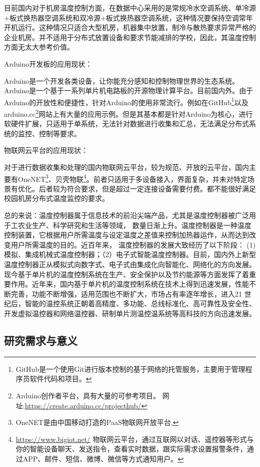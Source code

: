 目前国内对于机房温度控制方面，在数据中心采用的是常规冷水空调系统、单冷源+板式换热器空调系统和双冷源+板式换热器空调系统，这种情况要保持空调常年开机运行。这种情况只适合大型机房，机器集中放置，制冷与散热要求异常严格的企业机房。并不适用于分布式放置设备和要求节能减排的学校，因此，其温度控制方面无太大参考价值。

Arduino开发板的应用现状：

Arduino是一个开发各类设备，让你能充分感知和控制物理世界的生态系统。Arduino是一个基于一系列单片机电路板的开源物理计算平台。目前国内外。由于Arduino的开放性和便捷性，针对Arduino的使用非常流行。例如在GitHub\footnote{GitHub是一个使用Git进行版本控制的基于网络的托管服务，主要用于管理程序员软件代码和项目。}以及arduino.cc\footnote{Arduino创作者平台，具有大量的可参考项目。 网址:\url{https://create.arduino.cc/projecthub/} }网站上有大量的应用示例。但是其基本都是针对Arduino为核心，进行软硬件扩展，只适用于单系统，无法针对数据进行收集和汇总，无法满足分布式系统的监控、控制等要求。

物联网云平台的应用现状：

对于进行数据收集和处理的国内物联网云平台，较为规范、开放的云平台，国内主要有OneNET\footnote{OneNET是由中国移动打造的PaaS物联网开放平台,}、贝壳物联\footnote{\url{https://www.bigiot.net/} 物联网云平台，通过互联网以对话、遥控器等形式与你的智能设备聊天、发送指令，查看实时数据，跟实际需求设置报警条件，通过APP、邮件、短信、微博、微信等方式通知用户。}。前者只适用于多设备接入，界面复杂，并未对特定场景有优化。后者较为符合要求，但是超过一定连接设备需要付费。都不能很好满足校园机房分布式温度监控的要求。

总的来说：温度控制器属于信息技术的前沿尖端产品，尤其是温度控制器被广泛用于工农业生产、科学研究和生活等领域， 数量日渐上升。温度控制器是一种温度控制装置，它根据用户所需温度与设定温度之差值来控制加热器运作，从而达到改变用户所需温度的目的。近百年来， 温度控制器的发展大致经历了以下阶段：
(1) 模拟、集成机械式温度控制器；（2）电子式智能温度控制器。目前，国内外上新型温度控制器正从模拟式向数字式、电子式由集成化向智能化、网络化的方向发展。现今基于单片机的温度控制系统在生产、安全保护以及节约能源等方面发挥了着重要作用。近年来，国内基于单片机的温度控制系统在技术上得到迅速发展，性能不断完善，功能不断增强，适用范围也不断扩大，市场占有率逐年增长，进入21 世纪后，智能的温控系统正朝着高精度、多功能、总线标准化、高可靠性及安全性、开发虚拟温控器和网络温控器、研制单片测温控温系统等高科技的方向迅速发展。



\subsection{研究需求与意义}

